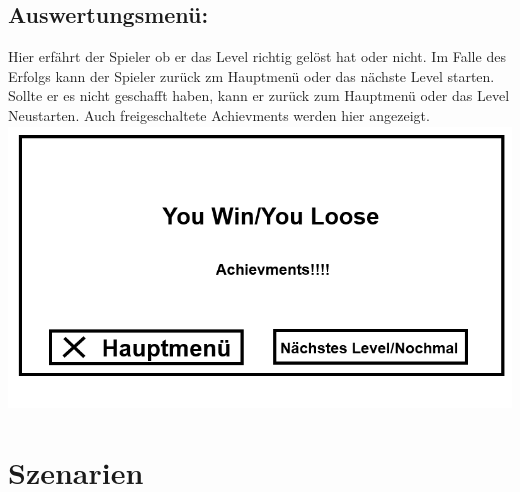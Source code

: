 \documentclass{scrartcl}
\begin{document}
\begin{enumerate}
	\begin{minipage}{1\textwidth}
		\item \subsection*{Auswertungsmenü:}
		Hier erfährt der Spieler ob er das Level richtig gelöst hat oder nicht.
		Im Falle des Erfolgs kann der Spieler zurück zm Hauptmenü oder das nächste Level starten.
		Sollte er es nicht geschafft haben, kann er zurück zum Hauptmenü oder das Level Neustarten. Auch freigeschaltete Achievments werden hier angezeigt.\\
		\includegraphics[width=\textwidth, height=7.5cm]{assets/Auswertungsmenu}
	\end{minipage}

\end{enumerate}

\clearpage














\section{Szenarien}
\end{document}
